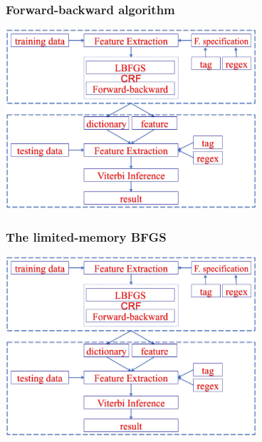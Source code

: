 \documentclass{beamer}
\begin{document}
\begin{frame}
  \frametitle{Forward-backward algorithm}
  \begin{center}
  \includegraphics[height=18em]{system.png}
  \end{center}
\end{frame}

\begin{frame}
  \frametitle{The limited-memory BFGS}
  \begin{center}
  \includegraphics[height=18em]{system.png}
  \end{center}
\end{frame}
\end{document}
